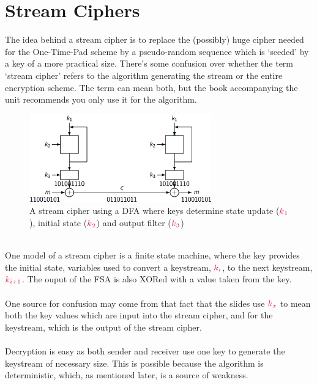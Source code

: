 \section{Stream Ciphers}
The idea behind a stream cipher is to replace the (possibly) huge cipher needed for the One-Time-Pad scheme by a pseudo-random sequence which is `seeded' by a key of a more practical size. There's some confusion over whether the term `stream cipher' refers to the algorithm generating the stream or the entire encryption scheme. The term can mean both, but the book accompanying the unit recommends you only use it for the algorithm.\\
\begin{figure}[htp!]
    \begin{center}
        \includegraphics[width=0.7\textwidth]{img/streamcipher}
        \caption{A stream cipher using a DFA where keys determine state update ($\csubk{1}$), initial state ($\csubk{2}$) and output filter ($\csubk{3}$)}
    \end{center}
\end{figure}
\\
One model of a stream cipher is a finite state machine, where the key provides the initial state, variables used to convert a keystream, $\csubk{i}$, to the next keystream, $\csubk{i+1}$. The ouput of the FSA is also XORed with a value taken from the key.\\
\\
One source for confusion may come from that fact that the slides use $\csubk{x}$ to mean both the key values which are input into the stream cipher, and for the keystream, which is the output of the stream cipher.\\
\\
Decryption is easy as both sender and receiver use one key to generate the keystream of necessary size. This is possible because the algorithm is deterministic, which, as mentioned later, is a source of weakness.
